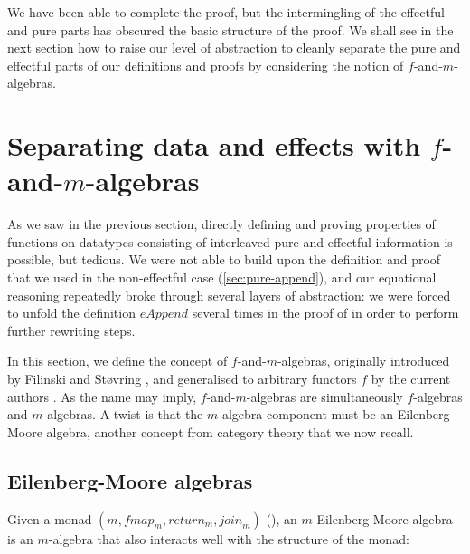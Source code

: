 We have been able to complete the proof, but the intermingling of the
effectful and pure parts has obscured the basic structure of the
proof. We shall see in the next section how to raise our level of
abstraction to cleanly separate the pure and effectful parts of our
definitions and proofs by considering the notion of
$f$-and-$m$-algebras.

\section{Separating data and effects with $f$-and-$m$-algebras}
\label{sec:f-and-m-algebras}

As we saw in the previous section, directly defining and proving
properties of functions on datatypes consisting of interleaved pure
and effectful information is possible, but tedious. We were not able
to build upon the definition and proof that we used in the
non-effectful case (\autoref{sec:pure-append}), and our equational
reasoning repeatedly broke through several layers of abstraction: we
were forced to unfold the definition $\mathit{eAppend}$ several times
in the proof of  in order to perform
further rewriting steps.

In this section, we define the concept of $f$-and-$m$-algebras,
originally introduced by Filinski and St\o{}vring
\cite{filinski07inductive}, and generalised to arbitrary functors $f$
by the current authors \cite{atkey12fibrational}. As the name may
imply, $f$-and-$m$-algebras are simultaneously $f$-algebras and
$m$-algebras. A twist is that the $m$-algebra component must be an
Eilenberg-Moore algebra, another concept from category theory that we
now recall.

\subsection{Eilenberg-Moore algebras}
\label{sec:eilenberg-moore-algebras}

Given a monad $(m, \mathit{fmap}_m, \mathit{return}_m,
\mathit{join}_m)$ (), an
$m$-Eilenberg-Moore-algebra is an $m$-algebra that also interacts well
with the structure of the monad:


